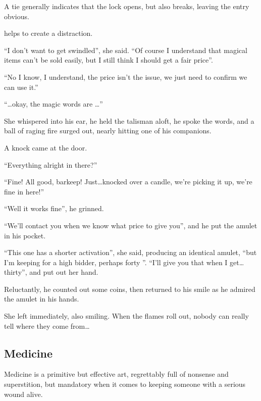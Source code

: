 \begin{multicols}{2}
\begin{description}
    A tie generally indicates that the lock opens, but also breaks, leaving the entry obvious.

  \item[\roll{Charisma}{Larceny}]
    helps to create a distraction.
\end{description}

\begin{exampletext}
  ``I don't want to get swindled'', she said.
  ``Of course I understand that magical items can't be sold easily, but I still think I should get a fair price''.

  ``No I know, I understand, the price isn't the issue, we just need to confirm we can use it.''

  ``\ldots okay, the magic words are \ldots''

  She whispered into his ear, he held the talisman aloft, he spoke the words, and a ball of raging fire surged out, nearly hitting one of his companions.

  A knock came at the door.

  ``Everything alright in there?''

  ``Fine!
  All good, barkeep!
  Just\ldots knocked over a candle, we're picking it up, we're fine in here!''

  ``Well it works fine'', he grinned.

  ``We'll contact you when we know what price to give you'', and he put the amulet in his pocket.

  ``This one has a shorter activation'', she said, producing an identical amulet, ``but I'm keeping for a high bidder, perhaps forty ''.
  ``I'll give you that when I get\ldots thirty'', and put out her hand.

  Reluctantly, he counted out some coins, then returned to his smile as he admired the amulet in his hands.

  She left immediately, also smiling.
  When the flames roll out, nobody can really tell where they come from\ldots
\end{exampletext}

\subsection{Medicine}

Medicine is a primitive but effective art, regrettably full of nonsense and superstition, but mandatory when it comes to keeping someone with a serious wound alive.


\end{multicols}
